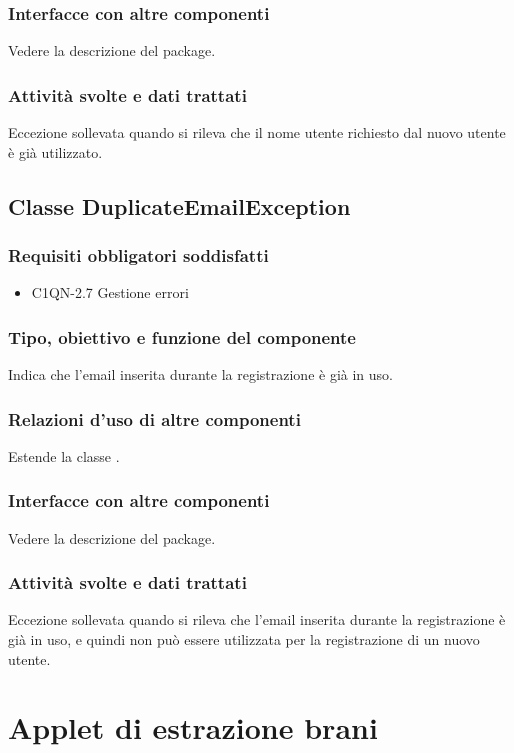 \subsubsection*{Interfacce con altre componenti}
Vedere la descrizione del package.
\subsubsection*{Attivit\`a svolte e dati trattati}
Eccezione sollevata quando si rileva che il nome utente richiesto dal nuovo
utente \`e gi\`a utilizzato.

\subsection{Classe DuplicateEmailException}
\subsubsection*{Requisiti obbligatori soddisfatti}
\begin{itemize}
	\item C1QN-2.7 Gestione errori
\end{itemize}
\subsubsection*{Tipo, obiettivo e funzione del componente}
Indica che l'email inserita durante la registrazione \`e gi\`a in uso.
\subsubsection*{Relazioni d'uso di altre componenti}
Estende la classe .
\subsubsection*{Interfacce con altre componenti}
Vedere la descrizione del package.
\subsubsection*{Attivit\`a svolte e dati trattati}
Eccezione sollevata quando si rileva che l'email inserita durante la
registrazione \`e gi\`a in uso, e quindi non pu\`o essere utilizzata per la
registrazione di un nuovo utente.

\newpage
\section{Applet di estrazione brani}


